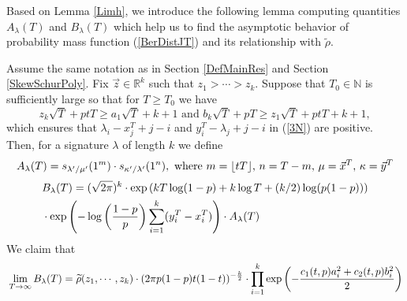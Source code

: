 Based on Lemma \ref{Limh}, we introduce the following lemma computing quantities $A_\lambda(T)$ and $B_{\lambda}(T)$ which help us to find the asymptotic behavior of probability mass function (\ref{BerDistJT}) and its relationship with $\widetilde{\rho}$.
\begin{lemma}{\label{ALambdaBLambda}}
	Assume the same notation as in Section \ref{DefMainRes} and Section \ref{SkewSchurPoly}. Fix $\vec{z}\in\mathbb{R}^{k}$ such that $z_1>\cdots>z_k$. Suppose that $T_{0}\in\mathbb{N}$ is sufficiently large so that for $T\geq T_{0}$ we have
$$z_{k}\sqrt{T}+ptT\geq a_1\sqrt{T}+k+1 \text{ and } b_{k}\sqrt{T}+pT\geq z_{1}\sqrt{T}+ptT+k+1,$$ which ensures that $\lambda_{i}-x^{T}_{j}+j-i$ and $y^{T}_{i}-\lambda_{j}+j-i$ in (\ref{3N}) are positive. Then, for a signature $\lambda$ of length $k$ we define
\begin{align}{\label{DefALambda}}
	A_{\lambda}(T)=s_{\lambda^{\prime}/\mu^{\prime}}(1^{m})\cdot s_{\kappa^{\prime}/\lambda^{\prime}}(1^{n}),\text{ where } m=\lfloor tT \rfloor \text{, } n=T-m\text{, }\mu=\vec{x}^{T}\text{, }\kappa=\vec{y}^{T}
\end{align} 
\begin{align}{\label{DefBLambda}}
\begin{split}
	& B_{\lambda}(T)=(\sqrt{2\pi})^{k}\cdot\exp\left(kT\log(1-p)+k\log T +(k/2)\log(p(1-p))\right)\\
	& \cdot \exp\left(-\log\left(\frac{1-p}{p}\right)\sum_{i=1}^{k}(y_{i}^{T}-x_{i}^{T})\right)\cdot A_{\lambda}(T)
\end{split}
\end{align}
We claim that
\begin{align}{\label{BLambda}}
	\lim_{T\rightarrow\infty} B_{\lambda}(T)=\widetilde{\rho}(z_1,\cdots,z_k)\cdot (2\pi p(1-p)t(1-t))^{-\frac{k}{2}}\cdot\prod_{i=1}^{k}\exp\left(-\frac{c_1(t,p)a_i^{2}+c_2(t,p)b_i^2}{2}\right)
\end{align}
\end{lemma}
